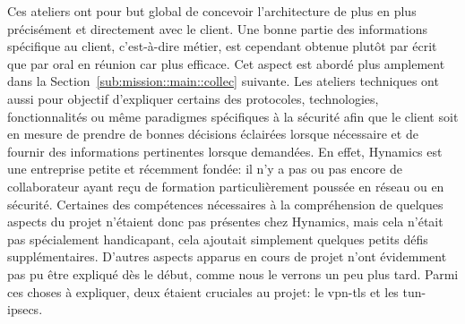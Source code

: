 \documentclass[12pt, oneside, a4paper, titlepage]{report}
\begin{document}
Ces ateliers ont pour but global de concevoir l'architecture de plus en plus
précisément et directement avec le client. Une bonne partie des informations
spécifique au client, c'est-à-dire métier, est cependant obtenue plutôt par
écrit que par oral en réunion car plus efficace.  Cet aspect est abordé plus
amplement dans la Section~\ref{sub:mission::main::collec} suivante. Les ateliers
techniques ont aussi pour objectif d'expliquer certains des protocoles,
technologies, fonctionnalités ou même paradigmes spécifiques à la sécurité afin
que le client soit en mesure de prendre de bonnes décisions éclairées lorsque
nécessaire et de fournir des informations pertinentes lorsque demandées. En
effet, Hynamics est une entreprise petite et récemment fondée: il n'y a pas ou
pas encore de collaborateur ayant reçu de formation particulièrement poussée en
réseau ou en sécurité. Certaines des compétences nécessaires à la compréhension
de quelques aspects du projet n'étaient donc pas présentes chez Hynamics, mais
cela n'était pas spécialement handicapant, cela ajoutait simplement quelques
petits défis supplémentaires. D'autres aspects apparus en cours de projet n'ont
évidemment pas pu être expliqué dès le début, comme nous le verrons un peu plus
tard. Parmi ces choses à expliquer, deux étaient cruciales au projet: le
\gls{vpn-tls} et les \glspl{tun-ipsec}.
\end{document}
